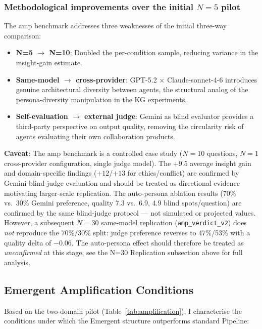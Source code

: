 \documentclass[12pt]{article}
\begin{document}
\subsubsection*{Methodological improvements over the initial $N=5$ pilot}

The amp benchmark addresses three weaknesses of the initial three-way comparison:

\begin{itemize}
  \item \textbf{N=5 $\to$ N=10}: Doubled the per-condition sample, reducing variance
        in the insight-gain estimate.
  \item \textbf{Same-model $\to$ cross-provider}: GPT-5.2 $\times$ Claude-sonnet-4-6
        introduces genuine architectural diversity between agents, the structural
        analog of the persona-diversity manipulation in the KG experiments.
  \item \textbf{Self-evaluation $\to$ external judge}: Gemini as blind evaluator
        provides a third-party perspective on output quality, removing the
        circularity risk of agents evaluating their own collaboration products.
\end{itemize}

\noindent\textbf{Caveat}: The amp benchmark is a controlled case study
($N=10$ questions, $N=1$ cross-provider configuration, single judge model).
The $+9.5$ average insight gain and domain-specific findings ($+12$/$+13$ for
ethics/conflict) are confirmed by Gemini blind-judge evaluation and should be
treated as directional evidence motivating larger-scale replication.
The auto-persona ablation results (70\% vs.\ 30\% Gemini preference, quality
7.3 vs.\ 6.9, 4.9 blind spots/question) are confirmed by the same
blind-judge protocol --- not simulated or projected values.
However, a subsequent $N=30$ same-model replication (\texttt{amp\_verdict\_v2})
does \emph{not} reproduce the 70\%/30\% split: judge preference reverses to
47\%/53\% with a quality delta of $-0.06$.
The auto-persona effect should therefore be treated as \emph{unconfirmed}
at this stage; see the N=30 Replication subsection above for full analysis.

\subsection*{Emergent Amplification Conditions}
\label{sec:amplification_conditions}

Based on the two-domain pilot (Table~\ref{tab:amplification}), I characterise
the conditions under which the Emergent structure outperforms standard Pipeline:
\end{document}
